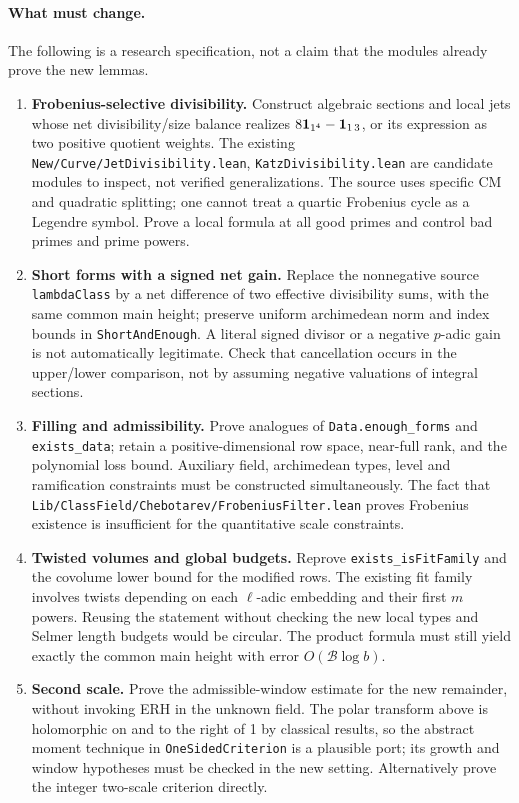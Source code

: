 \documentclass[11pt]{article}
\theoremstyle{remark}\newtheorem{remark}[theorem]{Remark}
\begin{document}
\paragraph{What must change.} The following is a research specification, not a claim that the modules already prove the new lemmas.
\begin{enumerate}[leftmargin=*,label=\textbf{G\arabic*.}]
\item \textbf{Frobenius-selective divisibility.} Construct algebraic sections and local jets whose net divisibility/size balance realizes $8\mathbf 1_{1^4}-\mathbf 1_{1\,3}$, or its expression as two positive quotient weights. The existing \nolinkurl{New/Curve/JetDivisibility.lean}, \texttt{KatzDivisibility.lean} are candidate modules to inspect, not verified generalizations. The source uses specific CM and quadratic splitting; one cannot treat a quartic Frobenius cycle as a Legendre symbol. Prove a local formula at all good primes and control bad primes and prime powers.
\item \textbf{Short forms with a signed net gain.} Replace the nonnegative source \texttt{lambdaClass} by a net difference of two effective divisibility sums, with the same common main height; preserve uniform archimedean norm and index bounds in \texttt{ShortAndEnough}. A literal signed divisor or a negative $p$-adic gain is not automatically legitimate. Check that cancellation occurs in the upper/lower comparison, not by assuming negative valuations of integral sections.
\item \textbf{Filling and admissibility.} Prove analogues of \texttt{Data.enough\_forms} and \texttt{exists\_data}; retain a positive-dimensional row space, near-full rank, and the polynomial loss bound. Auxiliary field, archimedean types, level and ramification constraints must be constructed simultaneously. The fact that \nolinkurl{Lib/ClassField/Chebotarev/FrobeniusFilter.lean} proves Frobenius existence is insufficient for the quantitative scale constraints.
\item \textbf{Twisted volumes and global budgets.} Reprove \texttt{exists\_isFitFamily} and the covolume lower bound for the modified rows. The existing fit family involves twists depending on each $\ell$-adic embedding and their first $m$ powers. Reusing the statement without checking the new local types and Selmer length budgets would be circular. The product formula must still yield exactly the common main height with error $O(\mathcal B\log b)$.
\item \textbf{Second scale.} Prove the admissible-window estimate for the new remainder, without invoking ERH in the unknown field. The polar transform above is holomorphic on and to the right of 1 by classical results, so the abstract moment technique in \texttt{OneSidedCriterion} is a plausible port; its growth and window hypotheses must be checked in the new setting. Alternatively prove the integer two-scale criterion directly.
\end{enumerate}
\end{document}
